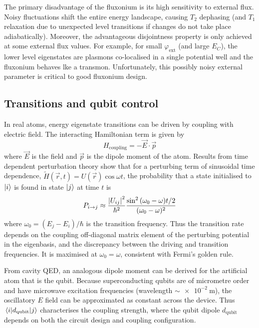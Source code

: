\documentclass[11pt]{article}
\begin{document}
The primary disadvantage of the fluxonium is its high sensitivity to external flux. Noisy fluctuations shift the entire energy landscape, causing $T_2$ dephasing (and $T_1$ relaxation due to unexpected level transitions if changes do not take place adiabatically). Moreover, the advantageous disjointness property is only achieved at some external flux values. For example, for small $\varphi_\text{ext}$ (and large $E_C$), the lower level eigenstates are plasmons co-localised in a single potential well and the fluxonium behaves lke a transmon. Unfortunately, this possibly noisy external parameter is critical to good fluxonium design.




\subsection{Transitions and qubit control}

In real atoms, energy eigenstate transitions can be driven by coupling with electric field. The interacting Hamiltonian term is given by
\begin{equation}
H_\text{coupling} = - \vec{E} \cdot \vec{p}
\end{equation}
where $\vec{E}$ is the field and $\vec{p}$ is the dipole moment of the atom. Results from time dependent perturbation theory show that for a perturbing term of sinusoidal time dependence, $\tilde{H}(\vec{r}, t) = U(\vec{r}) \cos{\omega t}$, the probability that a state initialised to $\ket{i}$ is found in state $\ket{j}$ at time $t$ is
\begin{equation}
P_{i \rightarrow j} \approx \frac{\abs{U_{ij}}^2}{\hbar^2} \frac{\sin^2{(\omega_0-\omega)t/2}}{(\omega_0-\omega)^2}
\end{equation}
where $\omega_0=(E_j - E_i)/\hbar$ is the transition frequency. Thus the transition rate depends on the coupling off-diagonal matrix element of the perturbing potential in the eigenbasis, and the discrepancy between the driving and transition frequencies. It is maximised at $\omega_0=\omega$, consistent with Fermi's golden rule.

From cavity QED, an analogous dipole moment can be derived for the artificial atom that is the qubit. Because superconducting qubits are of micrometre order and have microwave excitation frequencies (wavelength $\sim \SI{e-2}{\metre}$), the oscillatory $E$ field can be approximated as constant across the device. Thus $\matrixel{i}{d_\text{qubit}}{j}$ characterises the coupling strength, where the qubit dipole $d_\text{qubit}$ depends on both the circuit design and coupling configuration. 

\end{document}

